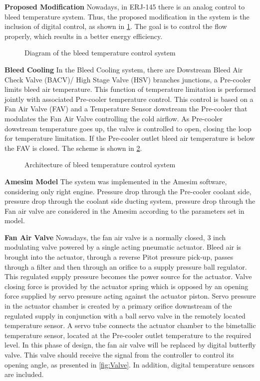 \textbf{Proposed Modification
}
Nowadays, in ERJ-145 there is an analog control to bleed temperature system. Thus, the proposed modification  in the system is the inclusion of digital control, as shown in  \ref{fig:BD}.
The goal is to control the flow properly, which results in a better energy efficiency.

\begin{figure}[H] %
\caption{Diagram of the bleed temperature control system}
\label{fig:BD}
\end{figure}

\textbf{Bleed Cooling
}
In the Bleed Cooling system, there are Dowstream Bleed Air Check Valve (BACV)/ High Stage Valve (HSV) branches junctions, a Pre-cooler limits bleed air temperature. This function of temperature limitation is performed jointly with associated Pre-cooler temperature control. This control is based on a Fan Air Valve (FAV) and a Temperature Sensor dowstream the Pre-cooler that modulates the Fan Air Valve controlling the cold airflow. As Pre-cooler dowstream temperature goes up, the valve is controlled to open, closing the loop for temperature limitation. If the Pre-cooler outlet bleed air temperature is below the FAV is closed. The scheme is shown in \ref{fig:arch}.

\begin{figure}[H] %
\caption{Architecture of bleed temperature control system}
\label{fig:arch}
\end{figure}

\textbf{Amesim Model
}
The system was implemented in the Amesim software, considering only right engine.
Pressure drop through the Pre-cooler coolant side, pressure drop through the coolant side ducting system, pressure drop through the Fan air valve are considered in the Amesim according to the parameters set in model.

\textbf{Fan Air Valve
}
Nowadays, the fan air valve is a normally closed, 3 inch modulating valve powered by a single acting pneumatic actuator. Bleed air is brought into the actuator, through a reverse Pitot pressure pick-up, passes through a filter and then through an orifice to a supply pressure ball regulator. This regulated supply pressure becomes the power source for the actuator. Valve closing force is provided by the actuator spring which is opposed by an opening force supplied by servo pressure acting against the actuator piston.
Servo pressure in the actuator chamber is created by a primary orifice downstream of the regulated supply in conjunction with a ball servo valve in the remotely located temperature sensor. A servo tube connects the actuator chamber to the bimetallic temperature sensor, located at the Pre-cooler outlet temperature to the required level.
In this phase of design, the fan air valve will be replaced by digital butterfly valve. This valve should receive the signal from the controller to control its opening angle, as presented in \ref{fig:Valve}. In addition, digital temperature sensors are included.

